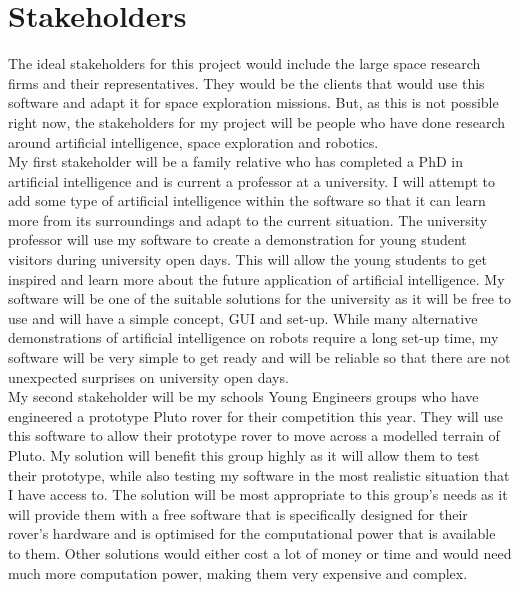 \documentclass[11pt]{report}
\begin{document}

\newpage
\section{Stakeholders}

	The ideal stakeholders for this project would include the large space research firms and their representatives. They would be the clients that would use this software and adapt it for space exploration missions. But, as this is not possible right now, the stakeholders for my project will be people who have done research around artificial intelligence, space exploration and robotics. \\

	My first stakeholder will be a family relative who has completed a PhD in artificial intelligence and is current a professor at a university. I will attempt to add some type of artificial intelligence within the software so that it can learn more from its surroundings and adapt to the current situation. The university professor will use my software to create a demonstration for young student visitors during university open days. This will allow the young students to get inspired and learn more about the future application of artificial intelligence. My software will be one of the suitable solutions for the university as it will be free to use and will have a simple concept, GUI and set-up. While many alternative demonstrations of artificial intelligence on robots require a long set-up time, my software will be very simple to get ready and will be reliable so that there are not unexpected surprises on university open days.\\  

	My second stakeholder will be my schools Young Engineers groups who have engineered a prototype Pluto rover for their competition this year. They will use this software to allow their prototype rover to move across a modelled terrain of Pluto. My solution will benefit this group highly as it will allow them to test their prototype, while also testing my software in the most realistic situation that I have access to. The solution will be most appropriate to this group's needs as it will provide them with a free software that is specifically designed for their rover's hardware and is optimised for the computational power that is available to them. Other solutions would either cost a lot of money or time and would need much more computation power, making them very expensive and complex. \\
\end{document}
